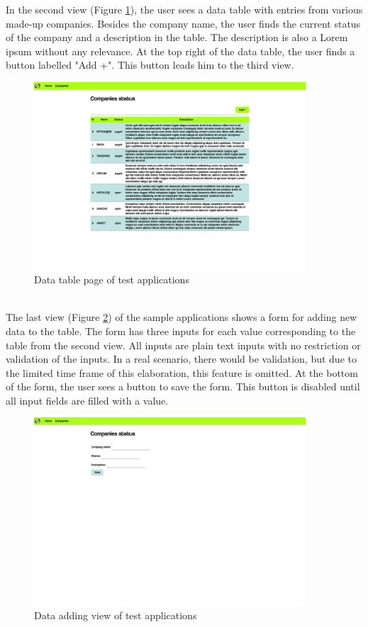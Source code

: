 In the second view (Figure \ref{data_table}), the user sees a data table with entries from various made-up companies. Besides the company name, the user finds the current status of the company and a description in the table. The description is also a Lorem ipsum without any relevance. At the top right of the data table, the user finds a button labelled "Add +". This button leads him to the third view. 
\begin{figure}[htbp]
    \centerline{\includegraphics[height=7cm, draft=false]{images/demo_view_data_table.png}}
    \caption{Data table page of test applications}
    \label{data_table}
    \end{figure}
    \\

The last view (Figure \ref{adding_form}) of the sample applications shows a form for adding new data to the table. The form has three inputs for each value corresponding to the table from the second view. All inputs are plain text inputs with no restriction or validation of the inputs. In a real scenario, there would be validation, but due to the limited time frame of this elaboration, this feature is omitted. At the bottom of the form, the user sees a button to save the form. This button is disabled until all input fields are filled with a value. 
\begin{figure}[htbp]
    \centerline{\includegraphics[height=7cm, draft=false]{images/demo_view_form.png}}
    \caption{Data adding view of test applications}
    \label{adding_form}
    \end{figure}
\\

